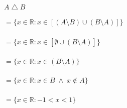 \paragraph{$A \bigtriangleup B$}
	\subparagraph{$= \{x \in \mathbb{R} : x \in [(A \setminus B) \cup (B \setminus A)]\}$}
	\subparagraph{$= \{x \in \mathbb{R} : x \in [\emptyset \cup (B \setminus A)]\}$}
	\subparagraph{$= \{x \in \mathbb{R} : x \in (B \setminus A)\}$}
	\subparagraph{$= \{x \in \mathbb{R} : x \in B \; \wedge \; x \notin A\}$}
	\subparagraph{$= \{x \in \mathbb{R} : -1 < x < 1\}$}